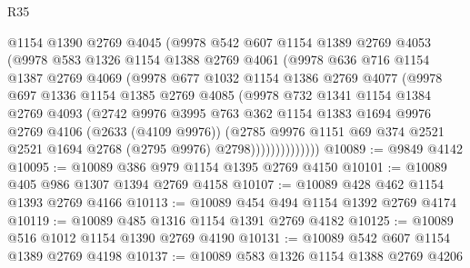 \begin{lexlean}{R35}
\begin{coremodule}
                @1154
                @1390
                @2769
                @4045
                (@9978
                  @542
                  @607
                  @1154
                  @1389
                  @2769
                  @4053
                  (@9978
                    @583
                    @1326
                    @1154
                    @1388
                    @2769
                    @4061
                    (@9978
                      @636
                      @716
                      @1154
                      @1387
                      @2769
                      @4069
                      (@9978
                        @677
                        @1032
                        @1154
                        @1386
                        @2769
                        @4077
                        (@9978
                          @697
                          @1336
                          @1154
                          @1385
                          @2769
                          @4085
                          (@9978
                            @732
                            @1341
                            @1154
                            @1384
                            @2769
                            @4093
                            (@2742
                              @9976
                              @3995
                              @763
                              @362
                              @1154
                              @1383
                              @1694
                              @9976
                              @2769
                              @4106
                              (@2633 (@4109 @9976))
                              (@2785
                                @9976
                                @1151
                                @69
                                @374
                                @2521
                                @2521
                                @1694
                                @2768
                                (@2795 @9976)
                                @2798))))))))))))))
@10089 := @9849 @4142
@10095 := @10089 @386 @979 @1154 @1395 @2769 @4150
@10101 := @10089 @405 @986 @1307 @1394 @2769 @4158
@10107 := @10089 @428 @462 @1154 @1393 @2769 @4166
@10113 := @10089 @454 @494 @1154 @1392 @2769 @4174
@10119 := @10089 @485 @1316 @1154 @1391 @2769 @4182
@10125 := @10089 @516 @1012 @1154 @1390 @2769 @4190
@10131 := @10089 @542 @607 @1154 @1389 @2769 @4198
@10137 := @10089 @583 @1326 @1154 @1388 @2769 @4206

\end{coremodule}
\end{lexlean}
